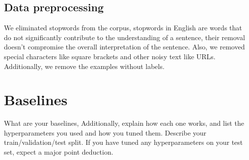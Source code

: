 \documentclass[11pt,a4paper]{article}
\begin{document}
\subsection{Data preprocessing}
We eliminated stopwords from the corpus, stopwords in English are words that do not significantly contribute to the understanding of a sentence, their removal doesn't compromise the overall interpretation of the sentence. Also, we removed special characters like square brackets and other noisy text like URLs. Additionally, we remove the examples without labels.



\section{Baselines}
What are your baselines,
Additionally, explain how each one works, and list the hyperparameters you used and how you tuned them. Describe your train/validation/test split. If you have tuned any hyperparameters on your test set, expect a major point deduction. 
\end{document}
